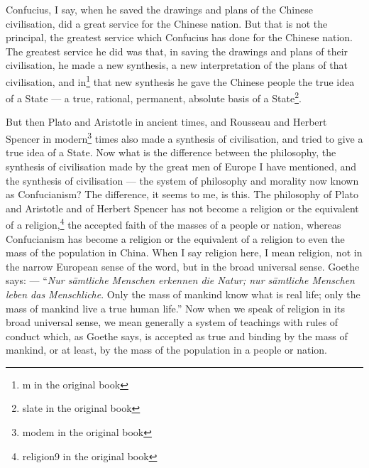 Confucius, I say, when he saved the drawings and plans of the Chinese civilisation, did a great service for the Chinese nation.
But that is not the principal, the greatest service which Confucius has done for the Chinese nation.
The greatest service he did was that, in saving the drawings and plans of their civilisation, he made a new synthesis, a new interpretation of the plans of that civilisation, and in\footnote{m in the original book} that new synthesis he gave the Chinese people the true idea of a State --- a true, rational, permanent, absolute basis of a State\footnote{slate in the original book}.

But then Plato  and Aristotle  in ancient times, and Rousseau  and Herbert Spencer   in modern\footnote{modem in the original book} times also made a synthesis of civilisation, and tried to give a true idea of a State.
Now what is the difference between the philosophy, the synthesis of civilisation made by the great men of Europe I have mentioned, and the synthesis of civilisation --- the system of philosophy and morality now known as Confucianism?
The difference, it seems to me, is this.
The philosophy of Plato and Aristotle and of Herbert Spencer has not become a religion or the equivalent of a religion,\footnote{religion9 in the original book} the accepted faith of the masses of a people or nation, whereas Confucianism has become a religion or the equivalent of a religion to even the mass of the population in China.
When I say religion here, I mean religion, not in the narrow European sense of the word, but in the broad universal sense.
Goethe says: --- ``\emph{Nur s\"amtliche Menschen erkennen die Natur; nur s\"amtliche Menschen leben das Menschliche}. Only the mass of mankind know what is real life; only the mass of mankind live a true human life.''\cite{num13}
Now when we speak of religion in its broad universal sense, we mean generally a system of teachings with rules of conduct which, as Goethe says, is accepted as true and binding by the mass of mankind, or at least, by the mass of the population in a people or nation.
